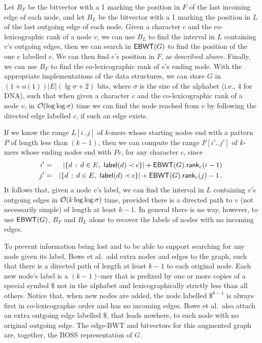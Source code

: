 Let $B_F$ be the bitvector with a 1 marking the position in $F$ of the last incoming edge of each node, and let $B_L$ be the bitvector with a 1 marking the position in $L$ of the last outgoing edge of each node.  Given a character $c$ and the co-lexicographic rank of a node $v$, we can use $B_L$ to find the interval in $L$ containing $v$'s outgoing edges, then we can search in \(\mathsf{EBWT} (G)\) to find the position of the one $e$ labelled $c$.  We can then find $e$'s position in $F$, as described above.  Finally, we can use $B_F$ to find the co-lexicographic rank of $e$'s ending node.  With the appropriate implementations of the data structures, we can store $G$ in \((1 + o (1)) |E| (\lg \sigma + 2)\) bits, where $\sigma$ is the size of the alphabet (i.e., 4 for DNA), such that when given a character $c$ and the co-lexicographic rank of a node $v$, in $\mathcal{O}\!\left({\log \log \sigma}\right)$ time we can find the node reached from $v$ by following the directed edge labelled $c$, if such an edge exists.

If we know the range \(L [i..j]\) of $k$-mers whose starting nodes end with a pattern $P$ of length less than \((k - 1)\), then we can compute the range \(F [i'..j']\) of $k$-mers whose ending nodes end with \(P c\), for any character $c$, since
\begin{eqnarray*}
    i' & = & |\{d\,:\,d \in E,\ \mathsf{label} (d) \prec c\}| + \mathsf{EBWT} (G).\mathsf{rank}_c (i - 1)\\ 
    j' & = & |\{d\,:\,d \in E,\ \mathsf{label} (d) \prec c\}| + \mathsf{EBWT} (G).\mathsf{rank}_c (j) - 1\,.
\end{eqnarray*}
It follows that, given a node $v$'s label, we can find the interval in $L$ containing $v$'s outgoing edges in $\mathcal{O}\!\left({k \log \log \sigma}\right)$ time, provided there is a directed path to $v$ (not necessarily simple) of length at least \(k - 1\).  In general there is no way, however, to use \(\mathsf{EBWT} (G)\), $B_F$ and $B_L$ alone to recover the labels of nodes with no incoming edges.

To prevent information being lost and to be able to support searching for any node given its label, Bowe et al.\ add extra nodes and edges to the graph, such that there is a directed path of length at least \(k - 1\) to each original node.  Each new node's label is a \((k - 1)\)-mer that is prefixed by one or more copies of a special symbol $\$$ not in the alphabet and lexicographically strictly less than all others.  Notice that, when new nodes are added, the node labelled $\$^{k - 1}$ is always first in co-lexicographic order and has no incoming edges.  Bowe et al.\ also attach an extra outgoing edge labelled $\$$, that leads nowhere, to each node with no original outgoing edge.  The edge-BWT and bitvectors for this augmented graph are, together, the BOSS representation of $G$.

